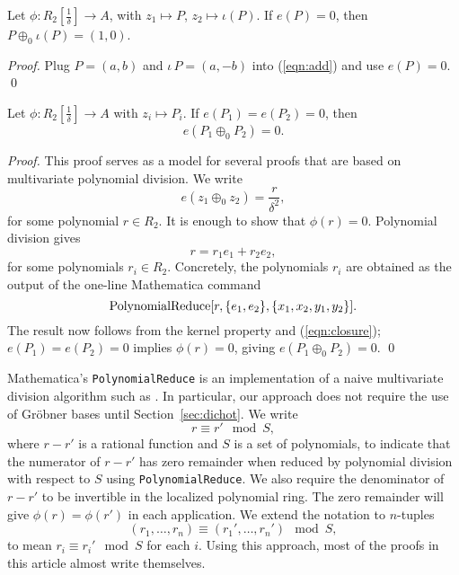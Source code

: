 \documentclass{llncs}
\newcommand{\op}[1]{\hbox{#1}}
\newcommand{\f}[1]{\frac{1}{#1}}
\begin{document}
\begin{lemma} [inverse] 
  Let $\phi:R_2[\f{\delta}]\to A$, with $z_1\mapsto P$, $z_2\mapsto
  \iota(P)$.  If $e(P)=0$, then $P\oplus_0 \iota(P) = (1,0)$.
\end{lemma}

\begin{proof} Plug $P=(a,b)$ and $\iota\,P=(a,-b)$ into
  (\ref{eqn:add}) and use $e(P)=0$.
\qed\end{proof}

\begin{lemma}\label{lemma:closure}
  Let $\phi:R_2[\f{\delta}]\to A$ with $z_i\mapsto P_i$.  If
  $e(P_1)=e(P_2)=0$, then
  \[
  e(P_1 \oplus_0 P_2) = 0.
  \]
\end{lemma}

\begin{proof} This proof serves as a model for several proofs that are
  based on multivariate polynomial division.  We write
\[
e(z_1\oplus_0 z_2) = \frac{r}{\delta^2},
\]
for some polynomial $r \in R_2$.  It is enough to show that
$\phi(r)=0$.  Polynomial division gives
\begin{equation}\label{eqn:closure}
r= r_1 e_1 + r_2 e_2,
\end{equation}
for some polynomials $r_i\in R_2$.  Concretely, the polynomials $r_i$
are obtained as the output of the one-line Mathematica command
\[
\op{PolynomialReduce}[r,\{e_1,e_2\},\{x_1,x_2,y_1,y_2\}].
\]
The result now follows from the kernel property and
(\ref{eqn:closure}); $ e(P_1) = e(P_2) = 0$ implies $\phi(r)= 0$,
giving ${e}(P_1\oplus_0 P_2)=0$.
\qed\end{proof}

Mathematica's {\tt PolynomialReduce} is an implementation of a naive multivariate division algorithm
such as \cite{cox1992ideals}.  In particular, our approach does not
require the use of Gr\"obner bases until Section~\ref{sec:dichot}.  We write
\[
r \equiv r' \mod S,
\]
where $r-r'$ is a rational function and $S$ is a set of polynomials,
to indicate that the numerator of $r-r'$ has zero remainder when
reduced by polynomial division with respect to $S$ using {\tt PolynomialReduce}.  We
also require the denominator of $r-r'$ to be invertible in the
localized polynomial ring.  The zero remainder will give
$\phi(r)=\phi(r')$ in each application.  We extend the notation to
$n$-tuples
\[
(r_1,\ldots,r_n) \equiv (r_1',\ldots,r_n') \mod S,
\]
to mean $r_i \equiv r_i' \mod S$ for each $i$.  Using this approach,
most of the proofs in this article almost write themselves.
\end{document}
